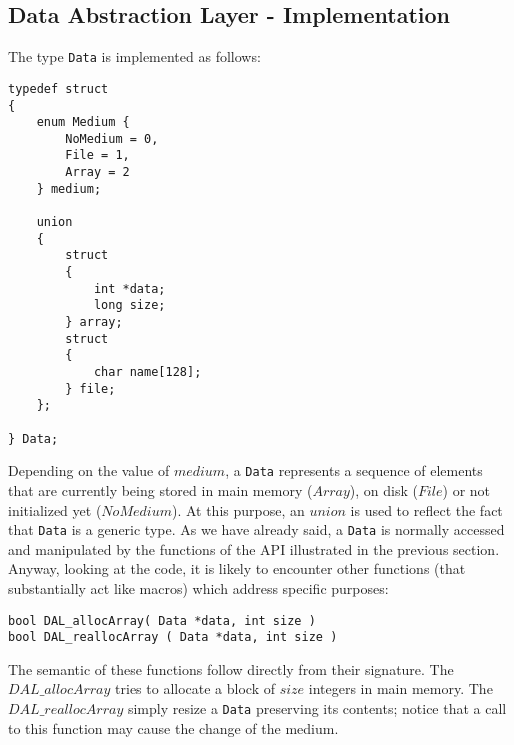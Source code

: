 \subsection*{Data Abstraction Layer - Implementation}
The type \texttt{Data} is implemented as follows:
\begin{lstlisting}
typedef struct
{
	enum Medium {
		NoMedium = 0,
		File = 1,
		Array = 2
	} medium;
	
	union
	{
		struct
		{
			int *data;
			long size;
		} array;
		struct
		{
			char name[128];
		} file;
	};
	
} Data;
\end{lstlisting}
Depending on the value of $medium$, a \texttt{Data} represents a sequence of elements that are currently being stored in main memory ($Array$), on disk ($File$) or not initialized yet ($NoMedium$). At this purpose, an $union$ is used to reflect the fact that \texttt{Data} is a generic type.  As we have already said, a \texttt{Data} is normally accessed and manipulated by the functions of the API illustrated in the previous section. Anyway, looking at the code, it is likely to encounter other functions (that substantially act like macros) which address specific purposes: 
\begin{lstlisting}
bool DAL_allocArray( Data *data, int size )
bool DAL_reallocArray ( Data *data, int size )
\end{lstlisting}
The semantic of these functions follow directly from their signature. The $DAL\_allocArray$ tries to allocate a block of $size$ integers in main memory. The $DAL\_reallocArray$ simply resize a \texttt{Data} preserving its contents; notice that a call to this function may cause the change of the medium. 

